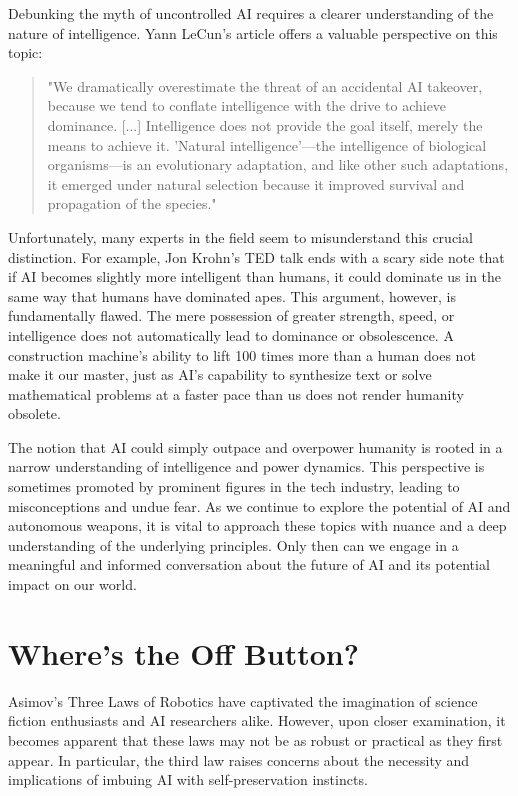 Debunking the myth of uncontrolled AI requires a clearer understanding of the nature of intelligence. Yann LeCun's article  offers a valuable perspective on this topic:

\begin{quote}
"We dramatically overestimate the threat of an accidental AI takeover, because we tend to conflate intelligence with the drive to achieve dominance. [...] Intelligence does not provide the goal itself, merely the means to achieve it. 'Natural intelligence'—the intelligence of biological organisms—is an evolutionary adaptation, and like other such adaptations, it emerged under natural selection because it improved survival and propagation of the species."
\end{quote}

Unfortunately, many experts in the field seem to misunderstand this crucial distinction. For example, Jon Krohn's TED talk ends with a scary side note that if AI becomes slightly more intelligent than humans, it could dominate us in the same way that humans have dominated apes. This argument, however, is fundamentally flawed. The mere possession of greater strength, speed, or intelligence does not automatically lead to dominance or obsolescence. A construction machine's ability to lift 100 times more than a human does not make it our master, just as AI's capability to synthesize text or solve mathematical problems at a faster pace than us does not render humanity obsolete.

The notion that AI could simply outpace and overpower humanity is rooted in a narrow understanding of intelligence and power dynamics. This perspective is sometimes promoted by prominent figures in the tech industry, leading to misconceptions and undue fear. As we continue to explore the potential of AI and autonomous weapons, it is vital to approach these topics with nuance and a deep understanding of the underlying principles. Only then can we engage in a meaningful and informed conversation about the future of AI and its potential impact on our world.


\section{Where's the Off Button?}

Asimov's Three Laws of Robotics have captivated the imagination of science fiction enthusiasts and AI researchers alike. However, upon closer examination, it becomes apparent that these laws may not be as robust or practical as they first appear. In particular, the third law raises concerns about the necessity and implications of imbuing AI with self-preservation instincts.

